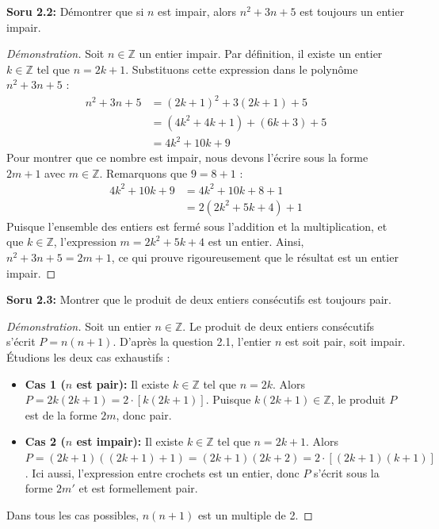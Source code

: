 \documentclass[12pt,a4paper]{report}
\begin{document}
\textbf{Soru 2.2:} Démontrer que si $n$ est impair, alors $n^2 + 3n + 5$ est toujours un entier impair.

\begin{proof}[Démonstration]
Soit $n \in \mathbb{Z}$ un entier impair. Par définition, il existe un entier $k \in \mathbb{Z}$ tel que $n = 2k + 1$.
Substituons cette expression dans le polynôme $n^2 + 3n + 5$ :
\begin{align*}
n^2 + 3n + 5 &= (2k + 1)^2 + 3(2k + 1) + 5 \\
&= (4k^2 + 4k + 1) + (6k + 3) + 5 \\
&= 4k^2 + 10k + 9
\end{align*}
Pour montrer que ce nombre est impair, nous devons l'écrire sous la forme $2m + 1$ avec $m \in \mathbb{Z}$. Remarquons que $9 = 8 + 1$ :
\begin{align*}
4k^2 + 10k + 9 &= 4k^2 + 10k + 8 + 1 \\
&= 2(2k^2 + 5k + 4) + 1
\end{align*}
Puisque l'ensemble des entiers est fermé sous l'addition et la multiplication, et que $k \in \mathbb{Z}$, l'expression $m = 2k^2 + 5k + 4$ est un entier.
Ainsi, $n^2 + 3n + 5 = 2m + 1$, ce qui prouve rigoureusement que le résultat est un entier impair.
\end{proof}

\textbf{Soru 2.3:} Montrer que le produit de deux entiers consécutifs est toujours pair.

\begin{proof}[Démonstration]
Soit un entier $n \in \mathbb{Z}$. Le produit de deux entiers consécutifs s'écrit $P = n(n+1)$.
D'après la question 2.1, l'entier $n$ est soit pair, soit impair. Étudions les deux cas exhaustifs :
\begin{itemize}
    \item \textbf{Cas 1 ($n$ est pair):} Il existe $k \in \mathbb{Z}$ tel que $n = 2k$.
    Alors $P = 2k(2k + 1) = 2 \cdot [k(2k + 1)]$. Puisque $k(2k+1) \in \mathbb{Z}$, le produit $P$ est de la forme $2m$, donc pair.
    \item \textbf{Cas 2 ($n$ est impair):} Il existe $k \in \mathbb{Z}$ tel que $n = 2k + 1$.
    Alors $P = (2k + 1)((2k + 1) + 1) = (2k + 1)(2k + 2) = 2 \cdot [(2k + 1)(k + 1)]$.
    Ici aussi, l'expression entre crochets est un entier, donc $P$ s'écrit sous la forme $2m'$ et est formellement pair.
\end{itemize}
Dans tous les cas possibles, $n(n+1)$ est un multiple de 2.
\end{proof}
\end{document}
